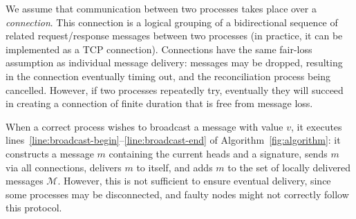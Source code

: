 \documentclass[a4paper,anonymous,USenglish]{lipics-v2019}
\begin{document}
We assume that communication between two processes takes place over a \emph{connection}.
This connection is a logical grouping of a bidirectional sequence of related request/response messages between two processes (in practice, it can be implemented as a TCP connection).
Connections have the same fair-loss assumption as individual message delivery: messages may be dropped, resulting in the connection eventually timing out, and the reconciliation process being cancelled.
However, if two processes repeatedly try, eventually they will succeed in creating a connection of finite duration that is free from message loss.

When a correct process wishes to broadcast a message with value $v$, it executes lines~\ref{line:broadcast-begin}--\ref{line:broadcast-end} of Algorithm~\ref{fig:algorithm}: it constructs a message $m$ containing the current heads and a signature, sends $m$ via all connections, delivers $m$ to itself, and adds $m$ to the set of locally delivered messages $\mathcal{M}$.
However, this is not sufficient to ensure eventual delivery, since some processes may be disconnected, and faulty nodes might not correctly follow this protocol.
\end{document}
